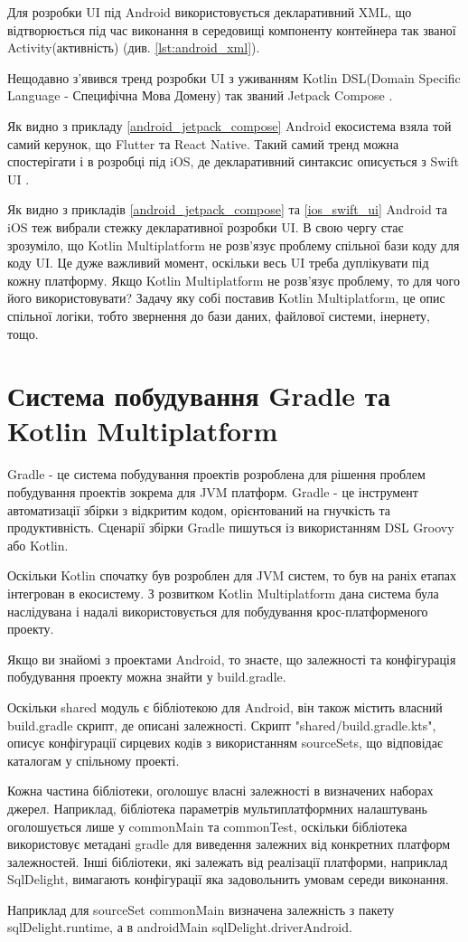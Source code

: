 Для розробки UI під Android використовується декларативний XML, що відтворюється під час виконання в середовищі компоненту
контейнера так званої Activity(активність) (див. \ref{lst:android_xml}).

Нещодавно з'явився тренд розробки UI з уживанням
Kotlin DSL(Domain Specific Language - Специфічна Мова Домену) так званий Jetpack Compose \cite{jetpack_compose}.

Як видно з прикладу \ref{android_jetpack_compose} Android екосистема взяла той самий керунок, що Flutter та React Native.
Такий самий тренд можна спостерігати і в розробці під iOS, де декларативний синтаксис описується з Swift UI \cite{swift_ui}.

Як видно з прикладів \ref{android_jetpack_compose} та \ref{ios_swift_ui} Android та iOS теж вибрали стежку декларативної розробки UI.
В свою чергу стає зрозуміло, що Kotlin Multiplatform не розв'язує проблему спільної бази коду для коду UI.
Це дуже важливий момент, оскільки весь UI треба дуплікувати під кожну платформу.
Якщо Kotlin Multiplatform не розв'язує проблему, то для чого його використовувати?
Задачу яку собі поставив Kotlin Multiplatform, це опис спільної логіки, тобто звернення до бази даних, файлової системи, інернету, тощо.

\section{Система побудування Gradle та Kotlin Multiplatform}
\label{sec:kmm_gradle}

Gradle - це система побудування проектів розроблена для рішення проблем побудування проектів зокрема для JVM платформ.
Gradle - це інструмент автоматизації збірки з відкритим кодом, орієнтований на гнучкість та продуктивність. \cite{gradle_user_manual}
Сценарії збірки Gradle пишуться із використанням DSL Groovy або Kotlin. \cite{gradle_user_manual}

Оскільки Kotlin спочатку був розроблен для JVM систем, то був на раніх етапах інтегрован в екосистему.
З розвитком Kotlin Multiplatform дана система була наслідувана і надалі використовується для побудування крос-платформеного проекту.

Якщо ви знайомі з проектами Android, то знаєте, що залежності та конфігурація побудування проекту можна знайти у build.gradle.

Оскільки shared модуль є бібліотекою для Android, він також містить власний build.gradle скрипт, де описані залежності.
Скрипт "shared/build.gradle.kts", описує конфігурації сирцевих кодів з використанням sourceSets, що відповідає каталогам у спільному проекті.

Кожна частина бібліотеки, оголошує власні залежності в визначених наборах джерел.
Наприклад, бібліотека параметрів мультиплатформних налаштувань оголошується лише у commonMain та commonTest,
оскільки бібліотека використовує метадані gradle для виведення залежних від конкретних платформ залежностей.
Інші бібліотеки, які залежать від реалізації платформи, наприклад SqlDelight, вимагають конфігурації яка задовольнить
умовам середи виконання.

Наприклад для sourceSet commonMain визначена залежність з пакету sqlDelight.runtime, а в androidMain sqlDelight.driverAndroid.
